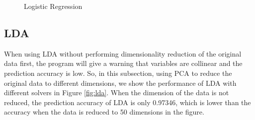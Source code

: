 \documentclass[10pt,journal,compsoc]{IEEEtran}
\begin{document}
\begin{figure}[!t]
  \centering
\caption{Logistic Regression}
\label{fig:logreg}
\end{figure}

\subsection{LDA}
\label{subsec:eva_lda}
When using LDA without performing dimensionality reduction of the original data first, the program will give a warning that variables are collinear and the prediction accuracy is low. So, in this subsection, using PCA to reduce the original data to different dimensions, we show the performance of LDA with different solvers in Figure \ref{fig:lda}. When the dimension of the data is not reduced, the prediction accuracy of LDA is only 0.97346, which is lower than the accuracy when the data is reduced to 50 dimensions in the figure.
\end{document}

